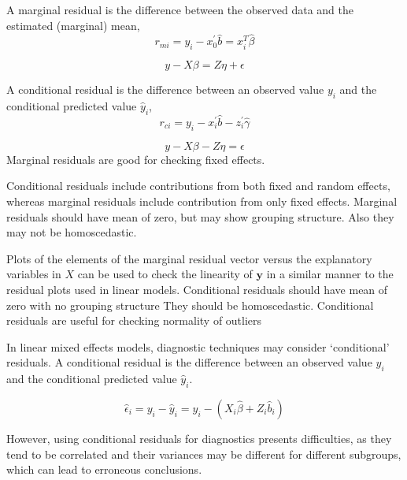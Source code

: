 \documentclass[12pt, a4paper]{report}
\theoremstyle{plain}
\theoremstyle{definition}
\theoremstyle{remark}
\begin{document}
	
	
	
	
	
	
	
	
	
	A marginal residual is the difference between the observed data and the estimated (marginal) mean, 
	\[r_{mi} = y_i - x_0^{\prime} \hat{b} =x^{T}_{i}\hat{\beta}\]
	
	\[y - X\beta = Z \eta +\epsilon \]
	
	A conditional residual is the difference between an observed value $y_{i}$ and the conditional predicted value $\hat{y}_{i} $,
	\[r_{ci} = y_i - x_i^{\prime} \hat{b} - z_i^{\prime} \hat{\gamma}\]
	
	\[y - X\beta - Z \eta = \epsilon \]
	 Marginal residuals are good for checking fixed effects.	
	 
	Conditional residuals include contributions from both fixed and random effects, whereas marginal residuals include contribution from only fixed effects. Marginal residuals should have mean of zero, but may show grouping structure. 
	Also they may not be homoscedastic.
	
	Plots of the elements of the marginal residual vector versus the explanatory variables in $X$ can be used to check the linearity of $\boldsymbol{y}$ in a similar manner to the residual plots used in linear models.
	Conditional residuals should have mean of zero with no grouping structure
	They should be homoscedastic. Conditional residuals are useful for checking normality of outliers
	
	
	In linear mixed effects models, diagnostic techniques may consider `conditional' residuals. A conditional residual is the difference between an observed value $y_{i}$ and the conditional predicted value $\hat{y}_{i} $.
	
	\[ \hat{\epsilon}_{i} = y_{i} - \hat{y}_{i} = y_{i} - ( X_{i}\hat{\beta} + Z_{i}\hat{b}_{i}) \]
	
	However, using conditional residuals for diagnostics presents difficulties, as they tend to be correlated and their variances may be different for different subgroups, which can lead to erroneous conclusions.
	
\end{document}

